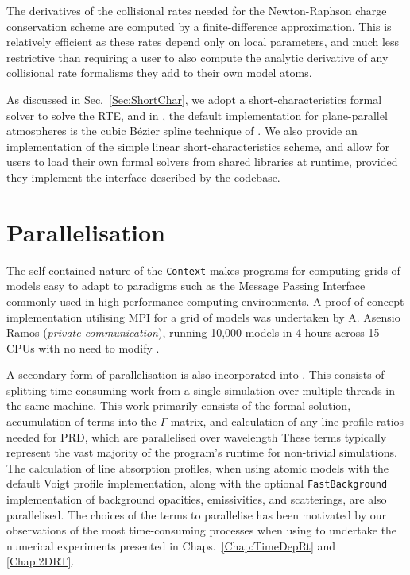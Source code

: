 The derivatives of the collisional rates needed for the Newton-Raphson charge conservation scheme are computed by a finite-difference approximation.
This is relatively efficient as these rates depend only on local parameters, and much less restrictive than requiring a user to also compute the analytic derivative of any collisional rate formalisms they add to their own model atoms.

As discussed in Sec.~\ref{Sec:ShortChar}, we adopt a short-characteristics formal solver to solve the RTE, and in \Lw{}, the default implementation for plane-parallel atmospheres is the cubic Bézier spline technique of \citet{DelaCruzRodriguez2013}.
We also provide an implementation of the simple linear short-characteristics scheme, and allow for users to load their own formal solvers from shared libraries at runtime, provided they implement the interface described by the \Lw{} codebase.


\section{Parallelisation}\label{Sec:LwParallelisation}

The self-contained nature of the \texttt{Context} makes \Lw{} programs for computing grids of models easy to adapt to paradigms such as the Message Passing Interface \citep[MPI, e.g.][for an overview of the MPICH implementation]{Gropp1996} commonly used in high performance computing environments.
A proof of concept implementation utilising MPI for a grid of models was undertaken by A. Asensio Ramos (\emph{private communication}), running 10,000 models in 4 hours across 15 CPUs with no need to modify \Lw{}.

A secondary form of parallelisation is also incorporated into \Lw{}.
This consists of splitting time-consuming work from a single simulation over multiple threads in the same machine.
This work primarily consists of the formal solution, accumulation of terms into the $\Gamma$ matrix, and calculation of any line profile ratios needed for PRD, which are parallelised over wavelength
These terms typically represent the vast majority of the program's runtime for non-trivial simulations.
The calculation of line absorption profiles, when using atomic models with the default Voigt profile implementation, along with the optional \texttt{FastBackground} implementation of background opacities, emissivities, and scatterings, are also parallelised.
The choices of the terms to parallelise has been motivated by our observations of the most time-consuming processes when using \Lw{} to undertake the numerical experiments presented in Chaps.~\ref{Chap:TimeDepRt} and \ref{Chap:2DRT}.


